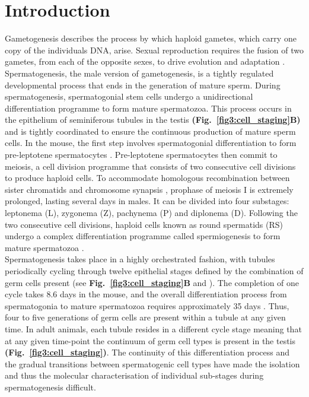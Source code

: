 
\section{Introduction}

Gametogenesis describes the process by which haploid gametes, which carry one copy of the individuals DNA, arise. Sexual reproduction requires the fusion of two gametes, from each of the opposite sexes, to drive evolution and adaptation \citep{McDonald2016}. Spermatogenesis, the male version of gametogenesis, is a tightly regulated developmental process that ends in the generation of mature sperm. During spermatogenesis, spermatogonial stem cells undergo a unidirectional differentiation programme to form mature spermatozoa. This process occurs in the epithelium of seminiferous tubules in the testis \textbf{(Fig.~\ref{fig3:cell_staging}B)} and is tightly coordinated to ensure the continuous production of mature sperm cells. In the mouse, the first step involves spermatogonial differentiation to form pre-leptotene spermatocytes \citep{Oakberg1971, DeRooij1973, DeRooij2000}. Pre-leptotene spermatocytes then commit to meiosis, a cell division programme that consists of two consecutive cell divisions to produce haploid cells. To accommodate homologous recombination between sister chromatids and chromosome synapsis \citep{Marston2004}, prophase of meiosis I is extremely prolonged, lasting several days in males. It can be divided into four substages: leptonema (L), zygonema (Z), pachynema (P) and diplonema (D). Following the two consecutive cell divisions, haploid cells known as round spermatids (RS) undergo a complex differentiation programme called spermiogenesis to form mature spermatozoa \citep{Oakberg1956}. \\

Spermatogenesis takes place in a highly orchestrated fashion, with tubules periodically cycling through twelve epithelial stages defined by the combination of germ cells present (see \textbf{Fig.~\ref{fig3:cell_staging}B} and \citep{Oakberg1956}). The completion of one cycle takes 8.6 days in the mouse, and the overall differentiation process from spermatogonia to mature spermatozoa requires approximately 35 days \citep{Oakberg1956a}. Thus, four to five generations of germ cells are present within a tubule at any given time. In adult animals, each tubule resides in a different cycle stage meaning that at any given time-point the continuum of germ cell types is present in the testis \textbf{(Fig.~\ref{fig3:cell_staging})}. The continuity of this differentiation process and the gradual transitions between spermatogenic cell types have made the isolation and thus the molecular characterisation of individual sub-stages during spermatogenesis difficult.


